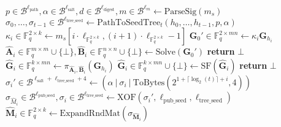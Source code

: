 \begin{algorithm}[H]
\begin{algorithmic}[1]
\State $p \in \mathcal{B}^{\ell_\text{path}}, \alpha \in \mathcal{B}^{\ell_\text{salt}}, d \in \mathcal{B}^{\ell_\text{digest}}, m \in \mathcal{B}^{\ell_m} \gets \text{ParseSig}(m_s)$
\State $\sigma_0, \ldots, \sigma_{t-1} \in \mathcal{B}^{\ell_\text{tree\_seed}} \gets \text{PathToSeedTree}_t(h_0, \ldots, h_{t-1}, p, \alpha)$
        \State $\kappa_i \in \mathds{F}_q^{2 \times k} \gets m_s[i \cdot \ell_{\mathds{F}_q^{2 \times k}}, (i + 1) \cdot \ell_{\mathds{F}_q^{2 \times k}} - 1]$
        \State $\textbf{G}_0' \in \mathds{F}_q^{2 \times mn} \gets \kappa_i \textbf{G}_{h_i}$
        \State $\hat{\textbf{A}}_i \in \mathds{F}_q^{m \times m} \cup \{\bot\}, \hat{\textbf{B}}_i \in \mathds{F}_q^{n \times n} \cup \{\bot\} \gets \text{Solve}(\textbf{G}_0')$
            \State \textbf{return} $\bot$
        \EndIf
        \State $\hat{\textbf{G}}_i \in \mathds{F}_q^{k \times mn} \gets \pi_{\hat{\textbf{A}}_i, \hat{\textbf{B}}_i}(\textbf{G}_{h_i})$
        \State $\hat{\textbf{G}}_i \in \mathds{F}_q^{k \times mn} \cup \{\bot\} \gets \text{SF}(\hat{\textbf{G}}_i)$
            \State \textbf{return} $\bot$
        \EndIf
    \Else
        \State $\sigma_i' \in \mathcal{B}^{\ell_\text{salt} + \ell_\text{tree\_seed} + 4} \gets (\alpha~|~\sigma_i~|~\text{ToBytes}(2^{1 + \lceil \log_2(t) \rceil + i}, 4))$
        \State $\sigma_{\hat{M}_i} \in \mathcal{B}^{\ell_\text{pub\_seed}}, \sigma_i \in \mathcal{B}^{\ell_\text{tree\_seed}} \gets \text{XOF}(\sigma_i', \ell_\text{pub\_seed}, \ell_\text{tree\_seed})$
        \State $\hat{\textbf{M}}_i \in \mathds{F}_q^{2 \times k} \gets \text{ExpandRndMat}(\sigma_{\hat{\textbf{M}}_i})$

\end{algorithmic}
\end{algorithm}
